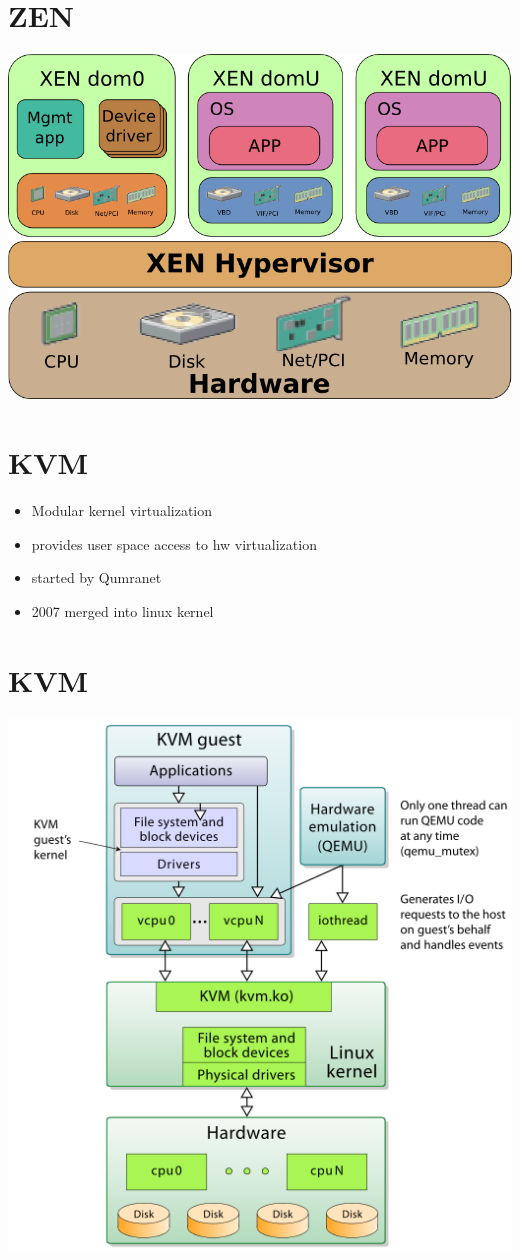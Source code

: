 \documentclass[11pt]{article}
\begin{document}
\section*{ZEN}
\label{sec:org8518e4d}
\begin{center}
\includegraphics[width=.9\linewidth]{./xen.png}
\end{center}

\section*{KVM}
\label{sec:orgda1ae52}
\begin{itemize}
\item Modular kernel virtualization
\item provides user space access to hw virtualization
\item started by Qumranet
\item 2007 merged into linux kernel
\end{itemize}

\section*{KVM}
\label{sec:org7ae14b8}
\begin{center}
\includegraphics[width=.9\linewidth]{./kvm.png}
\end{center}
\end{document}
